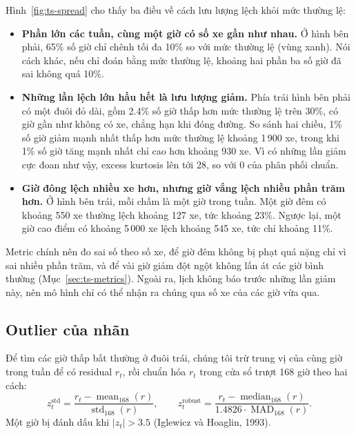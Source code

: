 Hình~\ref{fig:ts-spread} cho thấy ba điều về cách lưu lượng lệch khỏi mức thường lệ:
\begin{itemize}[leftmargin=1.5cm]
    \item \textbf{Phần lớn các tuần, cùng một giờ có số xe gần như nhau.} Ở hình bên phải, 65\% số giờ chỉ chênh tối đa 10\% so với mức
          thường lệ (vùng xanh). Nói cách khác, nếu chỉ đoán bằng mức thường lệ, khoảng hai phần ba số giờ đã sai không quá 10\%.
    \item \textbf{Những lần lệch lớn hầu hết là lưu lượng giảm.} Phía trái hình bên phải có một đuôi đỏ dài, gồm 2.4\% số giờ thấp hơn
          mức thường lệ trên 30\%, có giờ gần như không có xe, chẳng hạn khi đóng đường. So sánh hai chiều, 1\% số giờ giảm mạnh nhất thấp
          hơn mức thường lệ khoảng 1\,900 xe, trong khi 1\% số giờ tăng mạnh nhất chỉ cao hơn khoảng 930 xe. Vì có những lần giảm cực đoan
          như vậy, excess kurtosis lên tới 28, so với 0 của phân phối chuẩn.
    \item \textbf{Giờ đông lệch nhiều xe hơn, nhưng giờ vắng lệch nhiều phần trăm hơn.} Ở hình bên trái, mỗi chấm là một giờ trong tuần.
          Một giờ đêm có khoảng 550 xe thường lệch khoảng 127 xe, tức khoảng 23\%. Ngược lại, một giờ cao điểm có khoảng 5\,000 xe lệch
          khoảng 545 xe, tức chỉ khoảng 11\%.
\end{itemize}

\begin{tsinsight}
Metric chính nên đo sai số theo số xe, để giờ đêm không bị phạt quá nặng chỉ vì sai nhiều phần trăm, và để vài giờ giảm đột ngột không
lấn át các giờ bình thường (Mục~\ref{sec:ts-metrics}). Ngoài ra, lịch không báo trước những lần giảm này, nên mô hình chỉ có thể nhận ra
chúng qua số xe của các giờ vừa qua.
\end{tsinsight}

\subsection{Outlier của nhãn}
\label{sec:ts-outliers}
Để tìm các giờ thấp bất thường ở đuôi trái, chúng tôi trừ trung vị của cùng giờ trong tuần để có residual $r_t$, rồi chuẩn hóa $r_t$ trong
cửa sổ trượt 168 giờ theo hai cách:
\[
z^{\text{std}}_t = \frac{r_t - \operatorname{mean}_{168}(r)}{\operatorname{std}_{168}(r)}, \qquad
z^{\text{robust}}_t = \frac{r_t - \operatorname{median}_{168}(r)}{1.4826 \cdot \operatorname{MAD}_{168}(r)}.
\]
Một giờ bị đánh dấu khi $|z_t| > 3.5$ (Iglewicz và Hoaglin, 1993).

